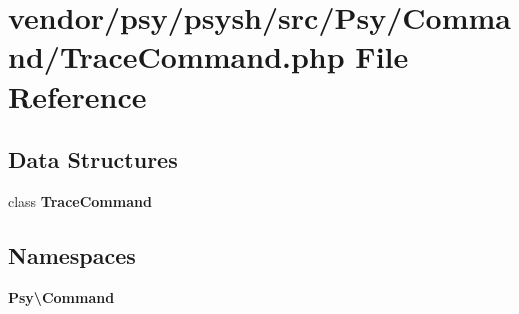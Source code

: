 \section{vendor/psy/psysh/src/\+Psy/\+Command/\+Trace\+Command.php File Reference}
\label{_trace_command_8php}
\subsection*{Data Structures}
\begin{DoxyCompactItemize}
\item 
class {\bf Trace\+Command}
\end{DoxyCompactItemize}
\subsection*{Namespaces}
\begin{DoxyCompactItemize}
\item 
 {\bf Psy\textbackslash{}\+Command}
\end{DoxyCompactItemize}
